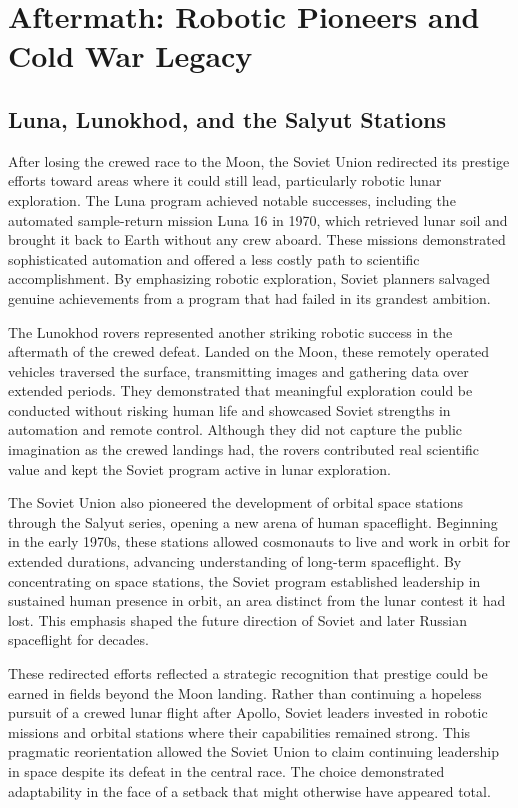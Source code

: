 \section{Aftermath: Robotic Pioneers and Cold War Legacy}

\subsection{Luna, Lunokhod, and the Salyut Stations}
After losing the crewed race to the Moon, the Soviet Union redirected its prestige efforts toward areas where it could still lead, particularly robotic lunar exploration. The Luna program achieved notable successes, including the automated sample-return mission Luna 16 in 1970, which retrieved lunar soil and brought it back to Earth without any crew aboard. These missions demonstrated sophisticated automation and offered a less costly path to scientific accomplishment. By emphasizing robotic exploration, Soviet planners salvaged genuine achievements from a program that had failed in its grandest ambition.

The Lunokhod rovers represented another striking robotic success in the aftermath of the crewed defeat. Landed on the Moon, these remotely operated vehicles traversed the surface, transmitting images and gathering data over extended periods. They demonstrated that meaningful exploration could be conducted without risking human life and showcased Soviet strengths in automation and remote control. Although they did not capture the public imagination as the crewed landings had, the rovers contributed real scientific value and kept the Soviet program active in lunar exploration.

The Soviet Union also pioneered the development of orbital space stations through the Salyut series, opening a new arena of human spaceflight. Beginning in the early 1970s, these stations allowed cosmonauts to live and work in orbit for extended durations, advancing understanding of long-term spaceflight. By concentrating on space stations, the Soviet program established leadership in sustained human presence in orbit, an area distinct from the lunar contest it had lost. This emphasis shaped the future direction of Soviet and later Russian spaceflight for decades.

These redirected efforts reflected a strategic recognition that prestige could be earned in fields beyond the Moon landing. Rather than continuing a hopeless pursuit of a crewed lunar flight after Apollo, Soviet leaders invested in robotic missions and orbital stations where their capabilities remained strong. This pragmatic reorientation allowed the Soviet Union to claim continuing leadership in space despite its defeat in the central race. The choice demonstrated adaptability in the face of a setback that might otherwise have appeared total.

